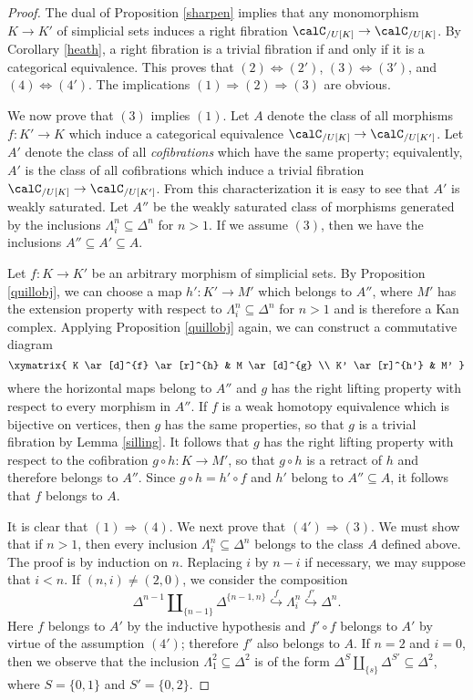 \begin{proof}
The dual of Proposition \ref{sharpen} implies that any monomorphism $K \rightarrow K'$ of simplicial sets induces a right fibration $\calC_{/U[K]} \rightarrow \calC_{/U[K]}$. By Corollary \ref{heath}, a right fibration is a trivial fibration if and only if it is a categorical equivalence.
This proves that $(2) \Leftrightarrow (2')$, $(3) \Leftrightarrow (3')$, and $(4) \Leftrightarrow (4')$. The implications $(1) \Rightarrow (2) \Rightarrow (3)$ are obvious. 

We now prove that $(3)$ implies $(1)$. Let $A$ denote the class of all morphisms $f: K' \rightarrow K$ which induce a categorical equivalence $\calC_{/U[K]} \rightarrow \calC_{/U[K']}$. 
Let $A'$ denote the class of all {\em cofibrations} which have the same property; equivalently, $A'$ is the class of all cofibrations which induce a trivial fibration $\calC_{/U[K]} \rightarrow \calC_{/U[K']}$. From this characterization it is easy to see that $A'$ is weakly saturated. Let $A''$ be the weakly saturated class of morphisms generated by the inclusions $\Lambda^n_i \subseteq \Delta^n$ for $n > 1$.
If we assume $(3)$, then we have the inclusions $A'' \subseteq A' \subseteq A$.

Let $f: K \rightarrow K'$ be an arbitrary morphism of simplicial sets. By Proposition \ref{quillobj}, we can choose a map $h': K' \rightarrow M'$ which belongs to $A''$, where $M'$ has the extension property with respect to $\Lambda^n_i \subseteq \Delta^n$ for $n > 1$ and is therefore a Kan complex. Applying Proposition \ref{quillobj} again, we can construct a commutative diagram
$$ \xymatrix{ K \ar[d]^{f} \ar[r]^{h} & M \ar[d]^{g} \\
K' \ar[r]^{h'} & M' }$$
where the horizontal maps belong to $A''$ and $g$ has the right lifting property with
respect to every morphism in $A''$. If $f$ is a weak homotopy equivalence which is bijective on vertices, then $g$ has the same properties, so that $g$ is a trivial fibration by Lemma \ref{silling}. It follows that $g$ has the right lifting property with respect to the cofibration $g \circ h: K \rightarrow M'$, so that $g \circ h$ is a retract of $h$ and therefore belongs to $A''$. Since $g \circ h = h' \circ f$ and $h'$ belong to $A'' \subseteq A$, it follows
that $f$ belongs to $A$.

It is clear that $(1) \Rightarrow (4)$. We next prove that $(4') \Rightarrow (3)$. We must show
that if $n > 1$, then every inclusion $\Lambda^n_i \subseteq \Delta^n$ belongs to the class $A$ defined above. The proof is by induction on $n$. Replacing $i$ by $n-i$ if necessary, we may suppose that $i < n$. If $(n,i) \neq (2,0)$, we consider the composition
$$ \Delta^{n-1} \amalg_{ \{n-1\} } \Delta^{ \{n-1, n\} } \stackrel{f}{\hookrightarrow} \Lambda^n_i \stackrel{f'}{\hookrightarrow} \Delta^n.$$
Here $f$ belongs to $A'$ by the inductive hypothesis and $f' \circ f$ belongs to $A'$ by virtue of the assumption $(4')$; therefore $f'$ also belongs to $A$. If $n=2$ and $i=0$, then we observe
that the inclusion $\Lambda^2_1 \subseteq \Delta^2$ is of the form
$\Delta^S \amalg_{ \{s\} } \Delta^{S'} \subseteq \Delta^2$, where $S = \{0,1\}$ and
$S' = \{0,2\}$. 


\end{proof}
